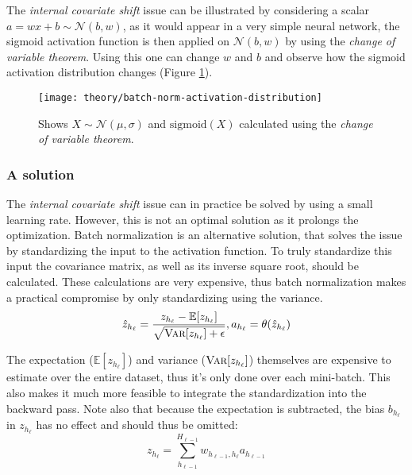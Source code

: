 The \textit{internal covariate shift} issue can be illustrated by considering a scalar $a = w x + b \sim \mathcal{N}(b, w)$, as it would appear in a very simple neural network, the sigmoid activation function is then applied on $\mathcal{N}(b, w)$ by using the \textit{change of variable theorem}. Using this one can change $w$ and $b$ and observe how the sigmoid activation distribution changes (Figure \ref{fig:convergence:batch-norm:activation-distribution}).

\begin{figure}[h]
	\centering
	\texttt{[image: theory/batch-norm-activation-distribution]}
	\caption{Shows $X \sim \mathcal{N}(\mu, \sigma)$ and $\mathrm{sigmoid}(X)$ calculated using the \textit{change of variable theorem}.}
	\label{fig:convergence:batch-norm:activation-distribution}
\end{figure}

\subsubsection{A solution}
The \textit{internal covariate shift} issue can in practice be solved by using a small learning rate. However, this is not an optimal solution as it prolongs the optimization. Batch normalization is an alternative solution, that solves the issue by standardizing the input to the activation function. To truly standardize this input the covariance matrix, as well as its inverse square root, should be calculated. These calculations are very expensive, thus batch normalization makes a practical compromise by only standardizing using the variance.
\begin{equation}
\hat{z}_{h_\ell} = \frac{z_{h_\ell} - \mathbb{E}[z_{h_\ell}]}{\sqrt{\textsc{Var}[z_{h_\ell}] + \epsilon}}, a_{h_\ell} = \theta(\hat{z}_{h_\ell})
\end{equation}

The expectation ($\mathbb{E}[z_{h_\ell}]$) and variance ($\textsc{Var}[z_{h_\ell}]$) themselves are expensive to estimate over the entire dataset, thus it's only done over each mini-batch. This also makes it much more feasible to integrate the standardization into the backward pass. Note also that because the expectation is subtracted, the bias $b_{h_\ell}$ in $z_{h_\ell}$ has no effect and should thus be omitted:
\begin{equation}
z_{h_\ell} = \sum_{h_{\ell-1}}^{H_{\ell-1}} w_{h_{\ell-1}, h_\ell} a_{h_{\ell-1}} 
\end{equation}


